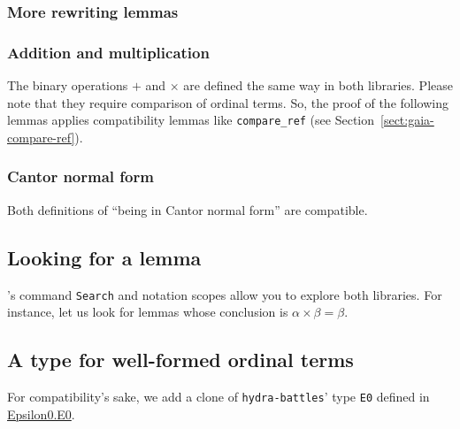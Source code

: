 
\subsubsection{More rewriting lemmas}





\subsubsection{Addition and multiplication}
\label{sect:plus-mult-gaia-hydras}

The binary operations $+$ and $\times$ are defined the same way in both libraries. Please note that they require comparison of ordinal terms. So, the proof of the following lemmas applies
compatibility lemmas like \texttt{compare\_ref} (see Section~\vref{sect:gaia-compare-ref}).




\subsubsection{Cantor normal form}
\label{nf-gaia-compat}
Both definitions of ``being in Cantor normal form'' are
compatible.




\subsection{Looking for a lemma}
\coq's command \texttt{Search} and notation scopes allow you to explore both libraries.
For instance, let us look for lemmas whose conclusion is
$\alpha \times \beta=\beta$.



\subsection{A type for well-formed ordinal terms}

For compatibility's sake, we add a clone of \texttt{hydra-battles}' type \texttt{E0} defined in \href{../theories/html/hydras.Epsilon0.E0.html}{Epsilon0.E0}.

